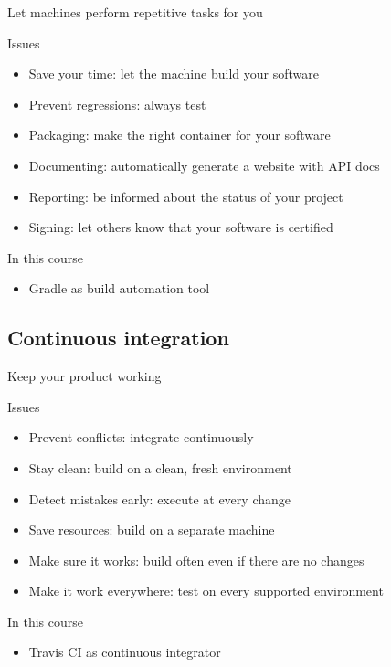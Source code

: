 \documentclass[presentation]{beamer}
\begin{document}
\begin{frame}{Let machines perform repetitive tasks for you}
    \begin{block}{Issues}
        \begin{itemize}
            \item Save your time: let the machine build your software
            \item Prevent regressions: always test
            \item Packaging: make the right container for your software
            \item Documenting: automatically generate a website with API docs
            \item Reporting: be informed about the status of your project
            \item Signing: let others know that your software is certified
        \end{itemize}
    \end{block}
    \begin{block}{In this course}
        \begin{itemize}
            \item Gradle as build automation tool
        \end{itemize}
    \end{block}
\end{frame}

\subsection{Continuous integration}

\begin{frame}{Keep your product working}
    \begin{block}{Issues}
        \begin{itemize}
            \item Prevent conflicts: integrate continuously
            \item Stay clean: build on a clean, fresh environment
            \item Detect mistakes early: execute at every change
            \item Save resources: build on a separate machine
            \item Make sure it works: build often even if there are no changes
            \item Make it work everywhere: test on every supported environment
        \end{itemize}
    \end{block}
    \begin{block}{In this course}
        \begin{itemize}
            \item Travis CI as continuous integrator
        \end{itemize}
    \end{block}
\end{frame}
\end{document}
